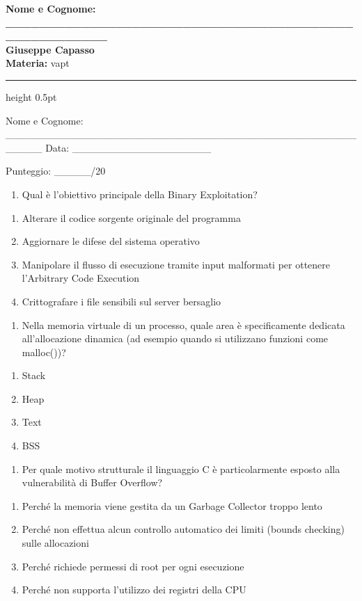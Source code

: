 \documentclass[11pt,a4paper]{article}
\providecommand{\tightlist}{%
  \setlength{\itemsep}{0pt}\setlength{\parskip}{0pt}}
\newcommand{\proposaltitle}[1]{
    \begin{center}
        \vspace*{0.1cm}
        {\LARGE \bfseries \color{blue} #1} \\[1.5ex]
        {\large \textbf{Giuseppe Capasso}} \\[1ex]
                \small{
            \vspace{0.1cm}
            \textbf{Materia:} vapt\\
        }
            \end{center}
    \vspace{0.3cm}
    \hrule height 0.5pt
    \vspace{0.5cm}
}
\begin{document}
\proposaltitle{Nome e Cognome: _____________________________________________________}

Nome e Cognome:
\_\_\_\_\_\_\_\_\_\_\_\_\_\_\_\_\_\_\_\_\_\_\_\_\_\_\_\_\_\_\_\_\_\_\_\_\_\_\_\_\_\_\_\_\_\_\_\_\_\_\_\_\_
Data: \_\_\_\_\_\_\_\_\_\_\_\_\_\_\_\_\_\_\_

Punteggio: \_\_\_\_\_/20

\begin{enumerate}
\def\labelenumi{\arabic{enumi}.}
\tightlist
\item
  Qual è l'obiettivo principale della Binary Exploitation?
\end{enumerate}

\begin{enumerate}
\def\labelenumi{\Alph{enumi})}
\tightlist
\item
  Alterare il codice sorgente originale del programma
\item
  Aggiornare le difese del sistema operativo
\item
  Manipolare il flusso di esecuzione tramite input malformati per
  ottenere l'Arbitrary Code Execution
\item
  Crittografare i file sensibili sul server bersaglio
\end{enumerate}

\begin{enumerate}
\def\labelenumi{\arabic{enumi}.}
\setcounter{enumi}{1}
\tightlist
\item
  Nella memoria virtuale di un processo, quale area è specificamente
  dedicata all'allocazione dinamica (ad esempio quando si utilizzano
  funzioni come malloc())?
\end{enumerate}

\begin{enumerate}
\def\labelenumi{\Alph{enumi})}
\tightlist
\item
  Stack
\item
  Heap
\item
  Text
\item
  BSS
\end{enumerate}

\begin{enumerate}
\def\labelenumi{\arabic{enumi}.}
\setcounter{enumi}{2}
\tightlist
\item
  Per quale motivo strutturale il linguaggio C è particolarmente esposto
  alla vulnerabilità di Buffer Overflow?
\end{enumerate}

\begin{enumerate}
\def\labelenumi{\Alph{enumi})}
\tightlist
\item
  Perché la memoria viene gestita da un Garbage Collector troppo lento
\item
  Perché non effettua alcun controllo automatico dei limiti (bounds
  checking) sulle allocazioni
\item
  Perché richiede permessi di root per ogni esecuzione
\item
  Perché non supporta l'utilizzo dei registri della CPU
\end{enumerate}
\end{document}
